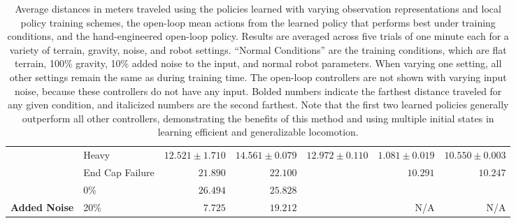 \begin{table}[t]
{\begin{tabular}{|llrrrrr|}
            \rowcolor[HTML]{D3D3D3}
            \cellcolor[HTML]{D3D3D3}                                   & Heavy           & \multicolumn{1}{r|}{\cellcolor[HTML]{D3D3D3}$12.521\pm1.710$}          & \multicolumn{1}{r|}{\cellcolor[HTML]{D3D3D3}$\mathbf{14.561\pm0.079}$} & \multicolumn{1}{r|}{\cellcolor[HTML]{D3D3D3}$\mathit{12.972\pm0.110}$} & \multicolumn{1}{r|}{\cellcolor[HTML]{D3D3D3}$1.081\pm0.019$}     & $10.550\pm0.003$ \\
            \rowcolor[HTML]{D3D3D3}
            \multirow{-2}{*}{\cellcolor[HTML]{D3D3D3}\textbf{Robot}}   & End Cap Failure & \multicolumn{1}{r|}{\cellcolor[HTML]{D3D3D3}$\mathit{21.890}$}         & \multicolumn{1}{r|}{\cellcolor[HTML]{D3D3D3}$\mathbf{22.100}$}         & \multicolumn{1}{r|}{\cellcolor[HTML]{D3D3D3}$ $}                       & \multicolumn{1}{r|}{\cellcolor[HTML]{D3D3D3}$10.291$}            & $10.247$ \\
                                                                       & 0\%             & \multicolumn{1}{r|}{$\mathbf{26.494}$}                                 & \multicolumn{1}{r|}{$\mathit{25.828}$}                                 & \multicolumn{1}{r|}{$ $}                                               & \multicolumn{1}{r|}{}                                            & \\
            \multirow{-2}{*}{\textbf{Added Noise}}                     & 20\%            & \multicolumn{1}{r|}{$\mathit{7.725}$}                                  & \multicolumn{1}{r|}{$\mathbf{19.212}$}                                 & \multicolumn{1}{r|}{$ $}                                               & \multicolumn{1}{r|}{\multirow{-2}{*}{N/A}}                       & \multirow{-2}{*}{N/A} \\
            \hline
        \end{tabular}%
    }
    \caption{
        \label{table:distance}
        Average distances in meters traveled using the policies learned with varying observation representations and local policy
        training schemes, the open-loop mean actions from the learned policy
        that performs best under training conditions, and the hand-engineered
        open-loop policy. Results are averaged across five trials of one minute
        each for a variety of terrain, gravity, noise, and robot settings.
        ``Normal Conditions'' are the training conditions, which are flat
        terrain, 100\% gravity, 10\% added noise to the input, and normal robot
        parameters. When varying one setting, all other settings remain the same
        as during training time. The open-loop controllers are not shown with
        varying input noise, because these controllers do not have any input.
        Bolded numbers indicate the farthest distance traveled for any given
        condition, and italicized numbers are the second farthest. Note that the
        first two learned policies generally outperform all other controllers,
        demonstrating the benefits of this method and using multiple initial
        states in learning efficient and generalizable locomotion.
    }
\end{table}

